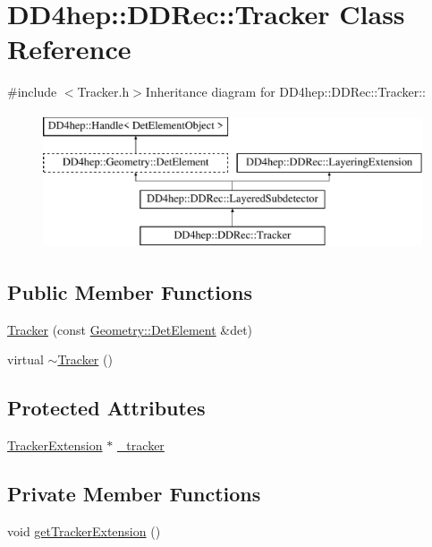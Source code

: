 \hypertarget{class_d_d4hep_1_1_d_d_rec_1_1_tracker}{
\section{DD4hep::DDRec::Tracker Class Reference}
\label{class_d_d4hep_1_1_d_d_rec_1_1_tracker}
}


{\ttfamily \#include $<$Tracker.h$>$}Inheritance diagram for DD4hep::DDRec::Tracker::\begin{figure}[H]
\begin{center}
\leavevmode
\includegraphics[height=4cm]{class_d_d4hep_1_1_d_d_rec_1_1_tracker}
\end{center}
\end{figure}
\subsection*{Public Member Functions}
\begin{DoxyCompactItemize}
\item 
\hyperlink{class_d_d4hep_1_1_d_d_rec_1_1_tracker_acd3f6faae57cfcd0cf7925e1473358ba}{Tracker} (const \hyperlink{class_d_d4hep_1_1_geometry_1_1_det_element}{Geometry::DetElement} \&det)
\item 
virtual \hyperlink{class_d_d4hep_1_1_d_d_rec_1_1_tracker_a8ac29fb4a453989eebf2201e6a2fca9f}{$\sim$Tracker} ()
\end{DoxyCompactItemize}
\subsection*{Protected Attributes}
\begin{DoxyCompactItemize}
\item 
\hyperlink{class_d_d4hep_1_1_d_d_rec_1_1_tracker_extension}{TrackerExtension} $\ast$ \hyperlink{class_d_d4hep_1_1_d_d_rec_1_1_tracker_a93fc69a19d898507a7c887b9f44b4663}{\_\-tracker}
\end{DoxyCompactItemize}
\subsection*{Private Member Functions}
\begin{DoxyCompactItemize}
\item 
void \hyperlink{class_d_d4hep_1_1_d_d_rec_1_1_tracker_aff21170847730cec8db36f09873ef52c}{getTrackerExtension} ()
\end{DoxyCompactItemize}


